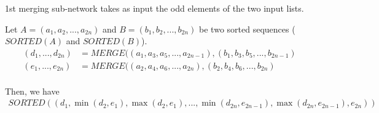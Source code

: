 
1st merging sub-network takes as input the odd elements of the two input lists.

\begin{prop}
Let $A=(a_1,a_2,...,a_{2n})$ and $B=(b_1,b_2,...,b_{2n})$ be two sorted sequences ($SORTED(A)$ and $SORTED(B)$).
\begin{align*}
(d_1, ..., d_{2n} ) & = MERGE((a_1, a_3, a_5, ..., a_{2n-1}), (b_1, b_3, b_5, ..., b_{2n-1})\\
(e_1, ..., e_{2n} ) & = MERGE((a_2, a_4, a_6, ..., a_{2n}), (b_2, b_4, b_6, ..., b_{2n})\\
\end{align*}

Then, we have
\begin{align*}
SORTED((d_1,\min (d_2,e_1),\max (d_2,e_1),..., \min (d_{2n}, e_{2n-1}), \max (d_{2n}, e_{2n-1}), e_{2n}))
\end{align*}
\end{prop}

